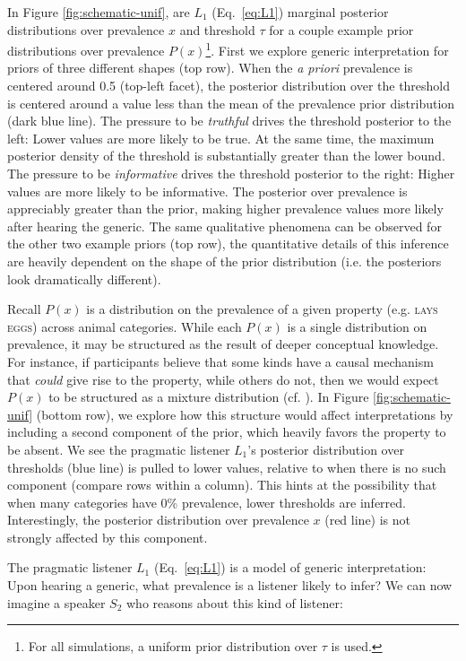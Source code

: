 \documentclass[12pt,letterpaper]{article}
\begin{document}
In Figure \ref{fig:schematic-unif}, are $L_1$ (Eq.~\ref{eq:L1}) marginal posterior distributions over prevalence $x$ and threshold $\tau$ for a couple example prior distributions over prevalence $P(x)$\footnote{For all simulations, a uniform prior distribution over $\tau$ is used.}. 
First we explore generic interpretation for priors of three different shapes (top row). 
When the \emph{a priori} prevalence is centered around 0.5 (top-left facet), the posterior distribution over the threshold is centered around a value less than the mean of the prevalence prior distribution (dark blue line). 
The pressure to be \emph{truthful} drives the threshold posterior to the left: Lower values are more likely to be true. 
At the same time, the maximum posterior density of the threshold is substantially greater than the lower bound. 
The pressure to be \emph{informative} drives the threshold posterior to the right: Higher values are more likely to be informative. 
The posterior over prevalence is appreciably greater than the prior, making higher prevalence values more likely after hearing the generic. 
The same qualitative phenomena can be observed for the other two example priors (top row), the quantitative details of this inference are heavily dependent on the shape of the prior distribution (i.e. the posteriors look dramatically different).

Recall $P(x)$ is a distribution on the prevalence of a given property (e.g. \textsc{lays eggs}) across animal categories. 
While each $P(x)$ is a single distribution on prevalence, it may be structured as the result of deeper conceptual knowledge. 
For instance, if participants believe that some kinds have a causal mechanism that \emph{could} give rise to the property, while others do not, then we would expect $P(x)$ to be structured as a mixture distribution (cf. ).
In Figure \ref{fig:schematic-unif} (bottom row), we explore how this structure would affect interpretations by including a second component of the prior, which heavily favors the property to be absent. 
We see the pragmatic listener $L_1$'s posterior distribution over thresholds (blue line) is pulled to lower values, relative to when there is no such component (compare rows within a column). 
This hints at the possibility that when many categories have 0\% prevalence, lower thresholds are inferred. 
Interestingly, the posterior distribution over prevalence $x$ (red line) is not strongly affected by this component.


The pragmatic listener $L_1$ (Eq.~\ref{eq:L1}) is a model of generic interpretation: Upon hearing a generic, what prevalence is a listener likely to infer?
We can now imagine a speaker $S_2$ who reasons about this kind of listener: 
\end{document}
